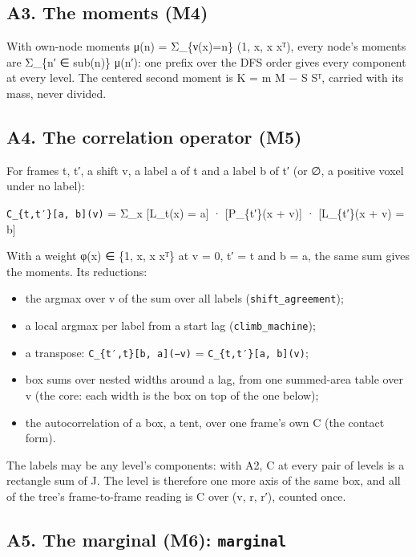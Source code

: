 \subsection{\texorpdfstring{A3. The moments (M4)}{A3. The moments (M4)}}

With own-node moments μ(n) = Σ\_\allowbreak{}\{ν(x)=n\} (1, x, x xᵀ), every node's moments are Σ\_\allowbreak{}\{n′ ∈ sub(n)\} μ(n′): one prefix over the DFS order gives every component at every level. The centered second moment is K = m M − S Sᵀ, carried with its mass, never divided.

\subsection{\texorpdfstring{A4. The correlation operator (M5)}{A4. The correlation operator (M5)}}

For frames t, t′, a shift v, a label a of t and a label b of t′ (or ∅, a positive voxel under no label):

\texttt{C\_\allowbreak{}\{t,t′\}[a, b](v)} = Σ\_\allowbreak{}x [L\_\allowbreak{}t(x) = a] · [P\_\allowbreak{}\{t′\}(x + v)] · [L\_\allowbreak{}\{t′\}(x + v) = b]

With a weight φ(x) ∈ \{1, x, x xᵀ\} at v = 0, t′ = t and b = a, the same sum gives the moments. Its reductions:

\begin{itemize}
\item the argmax over v of the sum over all labels (\texttt{shift\_\allowbreak{}agreement});
\item a local argmax per label from a start lag (\texttt{climb\_\allowbreak{}machine});
\item a transpose: \texttt{C\_\allowbreak{}\{t′,t\}[b, a](−v)} = \texttt{C\_\allowbreak{}\{t,t′\}[a, b](v)};
\item box sums over nested widths around a lag, from one summed-area table over v (the core: each width is the box on top of the one below);
\item the autocorrelation of a box, a tent, over one frame's own C (the contact form).
\end{itemize}

The labels may be any level's components: with A2, C at every pair of levels is a rectangle sum of J. The level is therefore one more axis of the same box, and all of the tree's frame-to-frame reading is C over (v, r, r′), counted once.

\subsection{\texorpdfstring{A5. The marginal (M6): \texttt{marginal}}{A5. The marginal (M6): marginal}}

